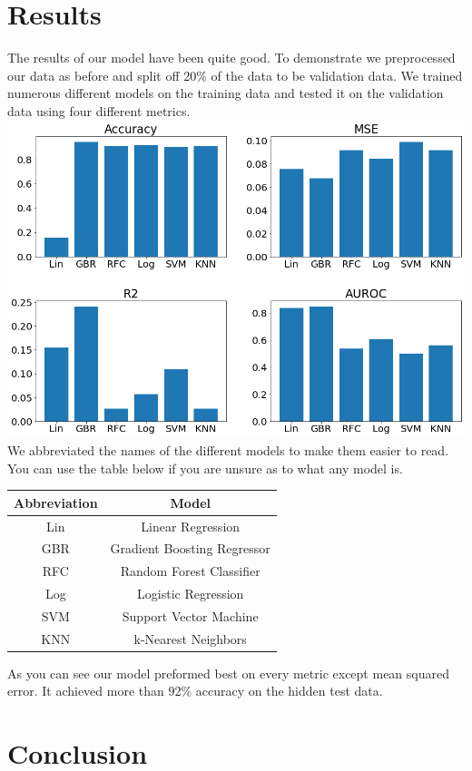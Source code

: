 \documentclass{article}
\begin{document}
\section{Results}

The results of our model have been quite good. To demonstrate we preprocessed our data as before and split off 20\% of the data to be validation data. We trained numerous different models on the training data and tested it on the validation data using four different metrics. 
\includegraphics[width=\linewidth]{FinalResults.png}
We abbreviated the names of the different models to make them easier to read. You can use the table below if you are unsure as to what any model is. 

\begin{tabular}{|c|c|}
    \hline
    Abbreviation & Model\\
    \hline
    Lin & Linear Regression\\
    GBR & Gradient Boosting Regressor\\
    RFC & Random Forest Classifier\\
    Log & Logistic Regression\\
    SVM & Support Vector Machine\\
    KNN & k-Nearest Neighbors\\
    \hline
\end{tabular}

As you can see our model preformed best on every metric except mean squared error. It achieved more than 92\% accuracy on the hidden test data. 

\section{Conclusion}
\end{document}
